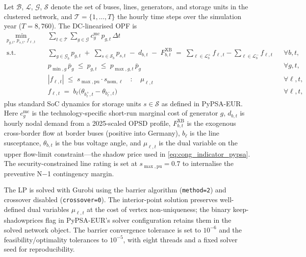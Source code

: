 Let $\mathcal{B}$, $\mathcal{L}$, $\mathcal{G}$, $\mathcal{S}$ denote the set of buses, lines, generators, and storage units in the clustered network, and $\mathcal{T} = \{1, \ldots, T\}$ the hourly time steps over the simulation year ($T = 8{,}760$). The DC-linearised OPF is
\begin{equation}
\begin{aligned}
    \min_{p_{g,t},\, p_{s,t},\, f_{\ell,t}} \quad
        & \sum_{t \in \mathcal{T}} \sum_{g \in \mathcal{G}} c^{\mathrm{mc}}_{g}\, p_{g,t}\, \Delta t \\
    \text{s.t.} \quad
        & \sum_{g \in \mathcal{G}_b} p_{g,t}
            \;+\; \sum_{s \in \mathcal{S}_b} p_{s,t}
            \;-\; d_{b,t}
            \;-\; F^{\mathrm{XB}}_{b,t}
            \;=\; \sum_{\ell \in \mathcal{L}_b^{+}} f_{\ell,t} - \sum_{\ell \in \mathcal{L}_b^{-}} f_{\ell,t}
        && \forall b, t, \\
        & p_{\min,g}\, \bar{p}_g \;\leq\; p_{g,t} \;\leq\; p_{\max,g,t}\, \bar{p}_g
        && \forall g, t, \\
        & |f_{\ell,t}| \;\leq\; s_{\max,\mathrm{pu}} \cdot s_{\mathrm{nom},\ell}
            \quad : \quad \mu_{\ell,t}
        && \forall \ell, t, \\
        & f_{\ell,t} \;=\; b_\ell \bigl(\theta_{b^{+}_\ell, t} - \theta_{b^{-}_\ell, t}\bigr)
        && \forall \ell, t,
\end{aligned}
\end{equation}
plus standard SoC dynamics for storage units $s \in \mathcal{S}$ as defined in PyPSA-EUR. Here $c^{\mathrm{mc}}_g$ is the technology-specific short-run marginal cost of generator $g$, $d_{b,t}$ is hourly nodal demand from a 2025-scaled OPSD profile, $F^{\mathrm{XB}}_{b,t}$ is the exogenous cross-border flow at border buses (positive into Germany), $b_\ell$ is the line susceptance, $\theta_{b,t}$ is the bus voltage angle, and $\mu_{\ell,t}$ is the dual variable on the upper flow-limit constraint—the shadow price used in \eqref{eq:cong_indicator_pypsa}. The security-constrained line rating is set at $s_{\max,\mathrm{pu}} = 0.7$ to internalise the preventive N$-$1 contingency margin.
 
The LP is solved with Gurobi using the barrier algorithm (\texttt{method=2}) and crossover disabled (\texttt{crossover=0}). The interior-point solution preserves well-defined dual variables $\mu_{\ell,t}$ at the cost of vertex non-uniqueness; the binary keep-shadowprices flag in PyPSA-EUR's solver configuration retains them in the solved network object. The barrier convergence tolerance is set to $10^{-6}$ and the feasibility/optimality tolerances to $10^{-5}$, with eight threads and a fixed solver seed for reproducibility.
 
